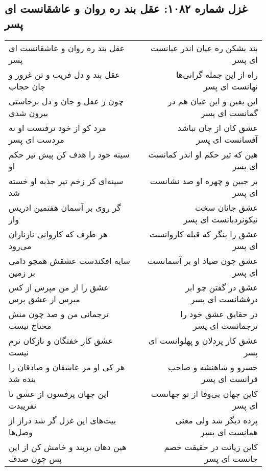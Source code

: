 \begin{center}
\section*{غزل شماره ۱۰۸۲: عقل بند ره روان و عاشقانست ای پسر}
\label{sec:1082}
\begin{longtable}{l p{0.5cm} r}
عقل بند ره روان و عاشقانست ای پسر
&&
بند بشکن ره عیان اندر عیانست ای پسر
\\
عقل بند و دل فریب و تن غرور و جان حجاب
&&
راه از این جمله گرانی‌ها نهانست ای پسر
\\
چون ز عقل و جان و دل برخاستی بیرون شدی
&&
این یقین و این عیان هم در گمانست ای پسر
\\
مرد کو از خود نرفتست او نه مردست ای پسر
&&
عشق کان از جان نباشد آفسانست ای پسر
\\
سینه خود را هدف کن پیش تیر حکم او
&&
هین که تیر حکم او اندر کمانست ای پسر
\\
سینه‌ای کز زخم تیر جذبه او خسته شد
&&
بر جبین و چهره او صد نشانست ای پسر
\\
گر روی بر آسمان هفتمین ادریس وار
&&
عشق جانان سخت نیکونردبانست ای پسر
\\
هر طرف که کاروانی نازنازان می‌رود
&&
عشق را بنگر که قبله کاروانست ای پسر
\\
سایه افکندست عشقش همچو دامی بر زمین
&&
عشق چون صیاد او بر آسمانست ای پسر
\\
عشق را از من مپرس از کس مپرس از عشق پرس
&&
عشق در گفتن چو ابر درفشانست ای پسر
\\
ترجمانی من و صد چون منش محتاج نیست
&&
در حقایق عشق خود را ترجمانست ای پسر
\\
عشق کار خفتگان و نازکان نرم نیست
&&
عشق کار پردلان و پهلوانست ای پسر
\\
هر کی او مر عاشقان و صادقان را بنده شد
&&
خسرو و شاهنشه و صاحب قرانست ای پسر
\\
این جهان پرفسون از عشق تا نفریبدت
&&
کاین جهان بی‌وفا از تو جهانست ای پسر
\\
بیت‌های این غزل گر شد دراز از وصل‌ها
&&
پرده دیگر شد ولی معنی همانست ای پسر
\\
هین دهان بربند و خامش کن از این پس چون صدف
&&
کاین زیانت در حقیقت خصم جانست ای پسر
\\
\end{longtable}
\end{center}
